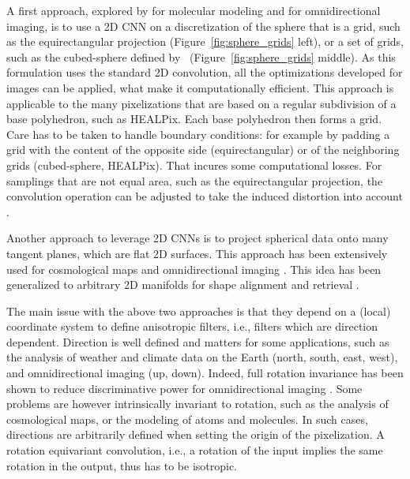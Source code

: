 \documentclass[final,twocolumn,3p,times,authoryear]{elsarticle}
\newcommand{\figref}[1]{Figure~\ref{fig:#1}}
\newcommand{\1}{\b{1}}              %
\newcommand{\0}{\b{0}}              %
\begin{document}
A first approach, explored by \citet{boomsma2017spherical} for molecular modeling and \citet{su2017sphericalconv, coors2018spherenet} for omnidirectional imaging, is to use a 2D CNN on a discretization of the sphere that is a grid, such as the equirectangular projection (\figref{sphere_grids} left), or a set of grids, such as the cubed-sphere defined by~\citet{ronchi1996cubed} (\figref{sphere_grids} middle).
As this formulation uses the standard 2D convolution, all the optimizations developed for images can be applied, what make it computationally efficient.
This approach is applicable to the many pixelizations that are based on a regular subdivision of a base polyhedron, such as HEALPix. Each base polyhedron then forms a grid.
Care has to be taken to handle boundary conditions: for example by padding a grid with the content of the opposite side (equirectangular) or of the neighboring grids (cubed-sphere, HEALPix). That incures some computational losses.
For samplings that are not equal area, such as the equirectangular projection, the convolution operation can be adjusted to take the induced distortion into account \citep{su2017sphericalconv, coors2018spherenet}.

Another approach to leverage 2D CNNs is to project spherical data onto many tangent planes, which are flat 2D surfaces. This approach has been extensively used for cosmological maps \citep{fluri2018deep, gupta2018nongaussianinformation, schmelze2017cosmologicalmodel, gillet2018deeplearning} and omnidirectional imaging \citep{xiao2012recognizing, zhang2014panocontext}. This idea has been generalized to arbitrary 2D manifolds for shape alignment and retrieval \citep{masci2015gcnn, boscaini2016acnn, monti2017monet}.

The main issue with the above two approaches is that they depend on a (local) coordinate system to define anisotropic filters, i.e., filters which are direction dependent. Direction is well defined and matters for some applications, such as the analysis of weather and climate data on the Earth (north, south, east, west), and omnidirectional imaging (up, down). Indeed, full rotation invariance has been shown to reduce discriminative power for omnidirectional imaging \citep{coors2018spherenet}. Some problems are however intrinsically invariant to rotation, such as the analysis of cosmological maps, or the modeling of atoms and molecules. In such cases, directions are arbitrarily defined when setting the origin of the pixelization. A rotation equivariant convolution, i.e., a rotation of the input implies the same rotation in the output, thus has to be isotropic.
\end{document}
